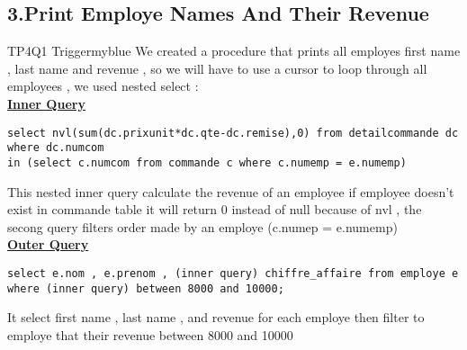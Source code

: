\vspace{0.03cm}
\subsection*{3.Print Employe Names And Their Revenue}


\begin{prettyBox}{TP4Q1 Trigger}{myblue}
We created a procedure that prints all employes first name , last name and revenue , so we will have to use a cursor
to loop through all employees , we used nested select :\\[0.15cm]
\textbf{\underline{Inner Query}}
\begin{lstlisting}
select nvl(sum(dc.prixunit*dc.qte-dc.remise),0) from detailcommande dc where dc.numcom
in (select c.numcom from commande c where c.numemp = e.numemp)
\end{lstlisting}
This nested inner query calculate the revenue of an employee if employee doesn't exist in commande table it will return 0 instead of null
because of nvl , the secong query filters order made by an employe (c.numep = e.numemp)\\[0.15cm]
\textbf{\underline{Outer Query}}
\begin{lstlisting}
select e.nom , e.prenom , (inner query) chiffre_affaire from employe e
where (inner query) between 8000 and 10000;
\end{lstlisting}
It select first name , last name , and revenue for each employe then filter to employe that their revenue between 8000 and 10000
\end{prettyBox}

\vspace{0.25cm}
